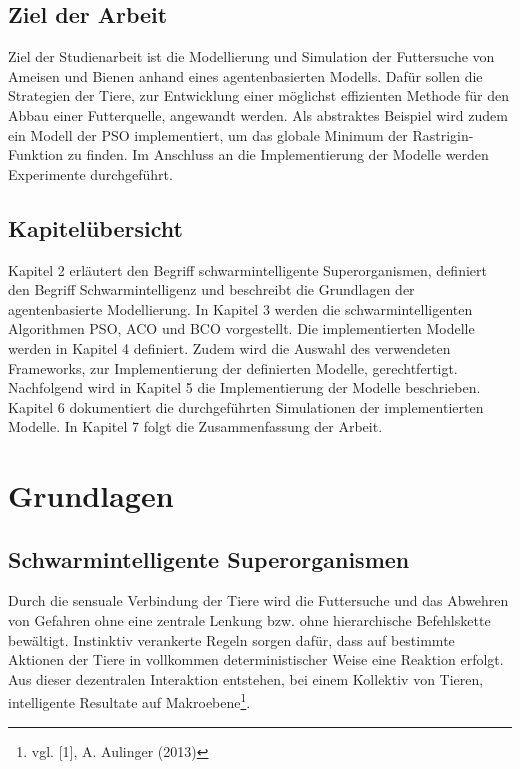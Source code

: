 \documentclass[a4paper, 11pt]{article}
\begin{document}
\subsection{Ziel der Arbeit}
Ziel der Studienarbeit ist die Modellierung und Simulation der Futtersuche von Ameisen und Bienen  anhand eines agentenbasierten Modells. Dafür sollen die Strategien der Tiere, zur Entwicklung einer möglichst effizienten Methode für den Abbau einer Futterquelle, angewandt werden. Als abstraktes Beispiel wird zudem ein Modell der \acs{PSO} implementiert, um das globale Minimum der Rastrigin-Funktion zu finden. Im Anschluss an die Implementierung der Modelle werden Experimente durchgeführt.
\subsection{Kapitelübersicht}
Kapitel 2 erläutert den Begriff schwarmintelligente Superorganismen, definiert den Begriff Schwarmintelligenz und beschreibt die Grundlagen der agentenbasierte Modellierung. In Kapitel 3 werden die schwarmintelligenten Algorithmen \acs{PSO}, \acs{ACO} und \acs{BCO} vorgestellt. Die implementierten Modelle werden in Kapitel 4 definiert. Zudem wird die Auswahl des verwendeten Frameworks, zur Implementierung der definierten Modelle, gerechtfertigt. Nachfolgend wird in Kapitel 5 die Implementierung der Modelle beschrieben. Kapitel 6 dokumentiert die durchgeführten Simulationen der implementierten Modelle. In Kapitel 7 folgt die Zusammenfassung der Arbeit.
\newpage
\section{Grundlagen}
\subsection{Schwarmintelligente Superorganismen}
Durch die sensuale Verbindung der Tiere wird die Futtersuche und das Abwehren von Gefahren ohne eine zentrale Lenkung bzw. ohne hierarchische Befehlskette bewältigt. Instinktiv verankerte Regeln sorgen dafür, dass auf bestimmte Aktionen der Tiere in vollkommen deterministischer Weise eine Reaktion erfolgt. Aus dieser dezentralen Interaktion entstehen, bei einem Kollektiv von Tieren, intelligente Resultate auf Makroebene\footnote{vgl. [1], A. Aulinger (2013)}.
\end{document}
